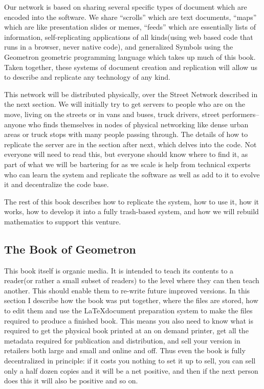 Our network is based on sharing several specific types of document which are encoded into the software.  We share ``scrolls'' which are text documents, ``maps'' which are like presentation slides or memes, ``feeds'' which are essentially lists of information, self-replicating applications of all kinds(using web based code that runs in a browser, never native code), and generalized Symbols using the Geometron geometric programming language which takes up much of this book.  Taken together, these systems of document creation and replication will allow us to describe and replicate any technology of any kind.  

This network will be distributed physically, over the Street Network described in the
 next section.  We will initially try to get servers to people who are on the move, living on the streets or in vans and buses, truck drivers, street performers--anyone who finds themselves in nodes of physical networking like dense urban areas or truck stops with many people passing through.  The details of how to replicate the server are in the section after next, which delves into the code.  Not everyone will need to read this, but everyone should know where to find it, as part of what we will be bartering for as we scale is help from technical experts who can learn the system and replicate the software as well as add to it to evolve it and decentralize the code base. 

The rest of this book describes how to replicate the system, how to use it, how it works, how to develop it into a fully trash-based system, and how we will rebuild mathematics to support this venture.  

\subsection{The Book of Geometron}

This book itself is organic media. It is intended to teach its contents to a reader(or rather a small subset of readers) to the level where they can then teach another.  This should enable them to re-write future improved versions.  In this section I describe how the book was put together, where the files are stored, how to edit them and use the \LaTeX document preparation system to make the files required to produce a finished book.  This means you also need to know what is required to get the physical book printed at an on demand printer, get all the metadata required for publication and distribution, and sell your version in retailers both large and small and online and off.  Thus even the book is fully decentralized in principle: if it costs you nothing to set it up to sell, you can sell only a half dozen copies and it will be a net positive, and then if the next person does this it will also be positive and so on.

